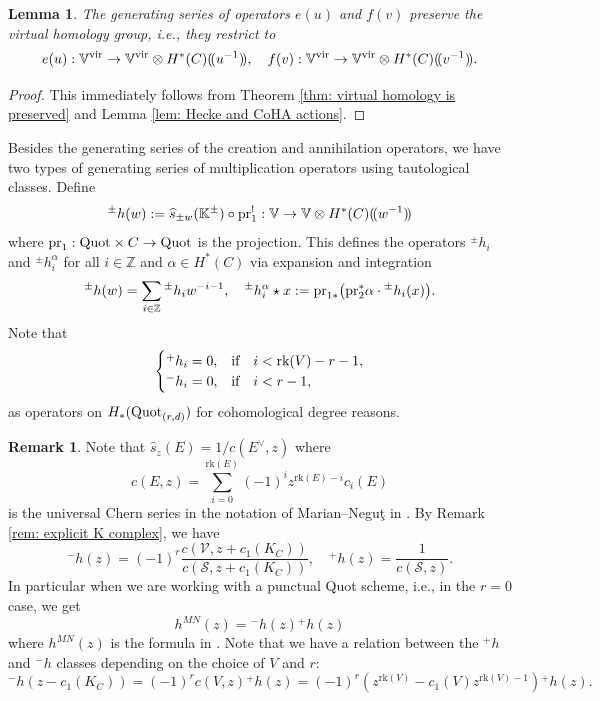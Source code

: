 \documentclass[10pt]{amsart}
\newcommand{\BZ}{\mathbb{Z}}
\newcommand{\BK}{\mathbb{K}}
\newcommand{\BV}{\mathbb{V}}
\newcommand{\Quot}{\textnormal{Quot}}
\newcommand{\pr}{\textnormal{pr}}
\newcommand{\+}{{}^+}
\newcommand{\rk}{\textnormal{rk}}
\newcommand{\vir}{\textnormal{vir}}
\newtheorem {lemma}[theorem]{Lemma}
\theoremstyle{definition}
\theoremstyle {definition}
\newtheorem{remark}[theorem]{Remark}
\theoremstyle {definition}
\begin{document}
\begin{lemma}
    The generating series of operators $e(u)$ and $f(v)$ preserve the virtual homology group, i.e., they restrict to 
    $$e(u):\BV^\vir\rightarrow \BV^\vir\otimes H^*(C)(\!(u^{-1})\!),\quad
    f(v):\BV^\vir\rightarrow \BV^\vir\otimes H^*(C)(\!(v^{-1})\!). 
    $$
\end{lemma}
\begin{proof}
    This immediately follows from Theorem \ref{thm: virtual homology is preserved} and Lemma \ref{lem: Hecke and CoHA actions}.
\end{proof}

Besides the generating series of the creation and annihilation operators, we have two types of generating series of multiplication operators using tautological classes. Define
\begin{align} \label{haction}{}^{\pm}h(w):=\widehat s_{\pm w}(\BK^\pm)\circ \pr_1^!:\BV\rightarrow  \BV\otimes H^*(C)(\!(w^{-1})\!)
\end{align}
where $\pr_1:\Quot\times C\rightarrow \Quot$ is the projection. This defines the operators ${}^{\pm}h_i$ and ${}^{\pm}h^{\alpha}_i$ for all $i\in \BZ$ and $\alpha\in H^*(C)$ via expansion and integration 
$${}^{\pm}h(w)=\sum_{i\in \BZ}{}^{\pm}h_i w^{-i-1},\quad {}^{\pm}h^{\alpha}_i\star x:=\pr_{1*}\big(\pr_2^*\alpha\cdot {}^{\pm}h_i(x)\big). 
$$
Note that 
\begin{equation}\label{eq: vanishing for small enough i}
    \begin{cases}
        {}^+h_i=0,&\textnormal{if}\quad i<\rk(V)-r-1,\\
        {}^-h_i=0,&\textnormal{if}\quad i<r-1,
    \end{cases}
\end{equation}
as operators on $H_*(\Quot_{(r,d)})$ for cohomological degree reasons.


\begin{remark} \label{rem: relation with NM action}
Note that $\hat{s}_{z}(E) = 1/c(E^\vee,z)$ where \[ c(E,z) = \sum_{i=0}^{\mathrm{rk}(E)}(-1)^i z^{\mathrm{rk}(E)-i}c_i(E)\] is the universal Chern series in the notation of Marian--Negu\c t in \cite{marian2026cohomologyquotschemesmooth}. By Remark \ref{rem: explicit K complex}, we have \[ {}^{-}h(z) = (-1)^{r}\frac{c(\mathcal{V},z+c_1(K_C))}{c(\mathcal{S},z+c_1(K_C))}, \quad {}^{+}h(z) = \frac{1}{c(\mathcal{S},z)}.\] In particular when we are working with a punctual Quot scheme, i.e., in the $r=0$ case, we get 
\begin{equation} \label{eqn:relationwithalinanegut}
h^{MN}(z)  = {}^{-}h(z){}^{+}h(z)
\end{equation}
where $h^{MN}(z)$ is the formula in \cite[eq. (16)]{marian2026cohomologyquotschemesmooth}. Note that we have a relation between the ${}^+h$ and ${}^-h$ classes depending on the choice of $V$ and $r$:
\begin{equation}\label{eqn: h+ h- relation}
{}^-h(z-c_1(K_C)) =(-1)^{r} c (V,z) {}^+h(z)  = (-1)^r(z^{\mathrm{rk}(V)}-c_1(V)z^{\mathrm{rk}(V)-1}){}^+h(z).
\end{equation}
\end{remark}
\end{document}
